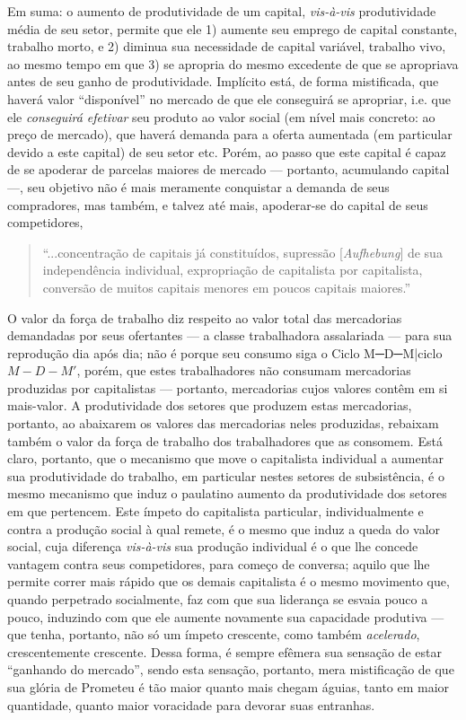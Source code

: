 Em suma: o aumento de produtividade de um capital, \textit{vis-à-vis} produtividade média de seu setor, permite que ele 1) aumente seu emprego de capital constante, trabalho morto, e 2) diminua sua necessidade de capital variável, trabalho vivo, ao mesmo tempo em que 3) se apropria do mesmo excedente de que se apropriava antes de seu ganho de produtividade. Implícito está, de forma mistificada, que haverá valor ``disponível'' no mercado de que ele conseguirá se apropriar, i.e. que ele \textit{conseguirá efetivar} seu produto ao valor social (em nível mais concreto: ao preço de mercado), que haverá demanda para a oferta aumentada (em particular devido a este capital) de seu setor etc. Porém, ao passo que este capital é capaz de se apoderar de parcelas maiores de mercado — portanto, acumulando capital —, seu objetivo não é mais meramente conquistar a demanda de seus compradores, mas também, e talvez até mais, apoderar-se do capital de seus competidores,
\begin{quote}
``...concentração de capitais já constituídos, supressão [\textit{Aufhebung}] de sua independência individual, expropriação de capitalista por capitalista, conversão de muitos capitais menores em poucos capitais maiores.'' \parencite[p. 701]{Marx2017}
\end{quote}

O valor da força de trabalho diz respeito ao valor total das mercadorias demandadas por seus ofertantes — a classe trabalhadora assalariada — para sua reprodução dia após dia; não é porque seu consumo siga o Ciclo M─D─M|ciclo $M-D-M'$, porém, que estes trabalhadores não consumam mercadorias produzidas por capitalistas — portanto, mercadorias cujos valores contêm em si mais-valor. A produtividade dos setores que produzem estas mercadorias, portanto, ao abaixarem os valores das mercadorias neles produzidas, rebaixam também o valor da força de trabalho dos trabalhadores que as consomem. Está claro, portanto, que o mecanismo que move o capitalista individual a aumentar sua produtividade do trabalho, em particular nestes setores de subsistência, é o mesmo mecanismo que induz o paulatino aumento da produtividade dos setores em que pertencem. Este ímpeto do capitalista particular, individualmente e contra a produção social à qual remete, é o mesmo que induz a queda do valor social, cuja diferença \textit{vis-à-vis} sua produção individual é o que lhe concede vantagem contra seus competidores, para começo de conversa; aquilo que lhe permite correr mais rápido que os demais capitalista é o mesmo movimento que, quando perpetrado socialmente, faz com que sua liderança se esvaia pouco a pouco, induzindo com que ele aumente novamente sua capacidade produtiva — que tenha, portanto, não só um ímpeto crescente, como também \textit{acelerado}, crescentemente crescente. Dessa forma, é sempre efêmera sua sensação de estar ``ganhando do mercado'', sendo esta sensação, portanto, mera mistificação de que sua glória de Prometeu é tão maior quanto mais chegam águias, tanto em maior quantidade, quanto maior voracidade para devorar suas entranhas. 

